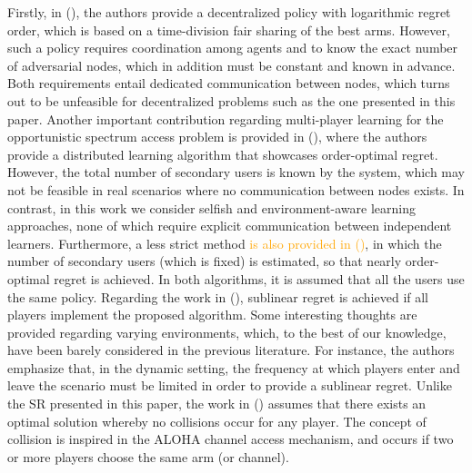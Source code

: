 \documentclass[preprint,12pt]{elsarticle}
\begin{document}
Firstly, in (\citealp{liu2010distributed}), the authors provide a decentralized policy with logarithmic regret order, which is based on a time-division fair sharing of the best arms. However, such a policy requires coordination among agents and to know the exact number of adversarial nodes, which in addition must be constant and known in advance. Both requirements entail dedicated communication between nodes, which turns out to be unfeasible for decentralized problems such as the one presented in this paper. Another important contribution regarding multi-player learning for the opportunistic spectrum access problem is provided in (\citealp{anandkumar2011distributed}), where the authors provide a distributed learning algorithm that showcases order-optimal regret. However, the total number of secondary users is known by the system, which may not be feasible in real scenarios where no communication between nodes exists. In contrast, in this work we consider selfish and environment-aware learning approaches, none of which require explicit communication between independent learners. Furthermore, a less strict method \textcolor{orange}{is also provided in (\citealp{anandkumar2011distributed})}, in which the number of secondary users (which is fixed) is estimated, so that nearly order-optimal regret is achieved. In both algorithms, it is assumed that all the users use the same policy. Regarding the work in (\citealp{rosenski2016multi}), sublinear regret is achieved if all players implement the proposed algorithm. Some interesting thoughts are provided regarding varying environments, which, to the best of our knowledge, have been barely considered in the previous literature. %
 For instance, the authors emphasize that, in the dynamic setting, the frequency at which players enter and leave the scenario must be limited in order to provide a sublinear regret. Unlike the SR presented in this paper, the work in (\citealp{rosenski2016multi}) assumes that there exists an optimal solution whereby no collisions occur for any player. The concept of collision is inspired in the ALOHA channel access mechanism, and occurs if two or more players choose the same arm (or channel). %
\end{document}
